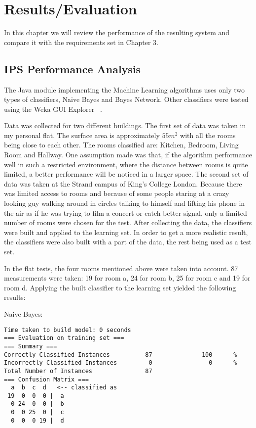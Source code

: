 \chapter{Results/Evaluation}
In this chapter we will review the performance of the resulting system and compare it with the requirements set in Chapter 3.
\section{IPS Performance Analysis}

The Java module implementing the Machine Learning algorithms uses only two types of classifiers, Naive Bayes and Bayes Network. Other classifiers were tested using the Weka GUI Explorer ~\cite{Weka}. 

Data was collected for two different buildings. The first set of data was taken in my personal flat. The surface area is approximately $55 m^2$ with all the rooms being close to each other. The rooms classified are: Kitchen, Bedroom, Living Room and Hallway. One assumption made was that, if the algorithm performance well in such a restricted environment, where the distance between rooms is quite limited, a better performance will be noticed in a larger space. The second set of data was taken at the Strand campus of King's College London. Because there was limited access to rooms and because of some people staring at a crazy looking guy walking around in circles talking to himself and lifting his phone in the air as if he was trying to film a concert or catch better signal, only a limited number of rooms were chosen for the test. After collecting the data, the classifiers were built and applied to the learning set. In order to get a more realistic result, the classifiers were also built with a part of the data, the rest being used as a test set.

In the flat tests, the four rooms mentioned above were taken into account. 87 measurements were taken: 19 for room a, 24 for room b, 25 for room c and 19 for room d. Applying the built classifier to the learning set yielded the following results:

\noindent Naive Bayes:
\begin{lstlisting}
Time taken to build model: 0 seconds
=== Evaluation on training set ===
=== Summary ===
Correctly Classified Instances          87              100      %
Incorrectly Classified Instances         0                0      %
Total Number of Instances               87     
=== Confusion Matrix ===
  a  b  c  d   <-- classified as
 19  0  0  0 |  a
  0 24  0  0 |  b
  0  0 25  0 |  c
  0  0  0 19 |  d
\end{lstlisting}

